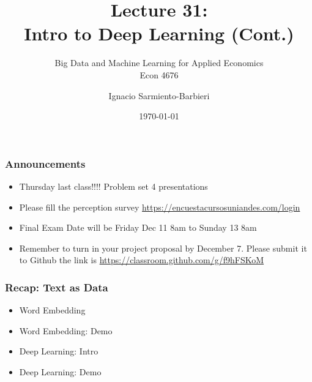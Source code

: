 \documentclass[
  shownotes,
  xcolor={svgnames},
  hyperref={colorlinks,citecolor=DarkBlue,linkcolor=DarkRed,urlcolor=DarkBlue}
  , aspectratio=169]{beamer}
\begin{document}
\title[Lecture 31]{Lecture 31: \\  Intro to Deep Learning (Cont.) }
\subtitle{Big Data and Machine Learning for Applied Economics \\ Econ 4676}
\date{\today}

\author[Sarmiento-Barbieri]{Ignacio Sarmiento-Barbieri}


\begin{frame}[noframenumbering]
\maketitle
\end{frame}





\begin{frame}
\frametitle{Announcements }


\begin{itemize} 
    \item  Thursday last class!!!! Problem set 4 presentations
    \bigskip
    \item Please fill the perception survey \url{https://encuestacursosuniandes.com/login}
    \bigskip
    \item  Final Exam Date will be Friday Dec 11 8am to Sunday 13 8am
    \bigskip
    \item  Remember to turn in your project proposal by December 7. Please submit it to Github the link is \url{https://classroom.github.com/g/f9hFSKoM}
    
\end{itemize}
\end{frame}

\begin{frame}
\frametitle{Recap: Text as Data}

\begin{itemize} 
  

\item  Word Embedding
\bigskip
\item  Word Embedding: Demo
\bigskip
\item  Deep Learning: Intro
\bigskip
\item  Deep Learning: Demo
\bigskip

\end{itemize}
  
\end{frame}
\end{document}
